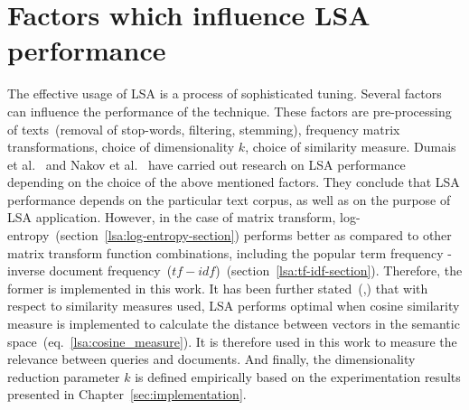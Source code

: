 \section{Factors which influence LSA performance}
\label{sec:lsa:factors_infl_lsa}
The effective usage of \gls{LSA} is a process of sophisticated tuning. Several factors can influence the performance of the technique. These factors are pre-processing of texts~(removal of stop-words, filtering, stemming), frequency matrix transformations, choice of dimensionality $k$, choice of similarity measure. Dumais et al.~\cite{dumais91improving} and Nakov et al.~\cite{Nakov_weightfunctions} have carried out research on \gls{LSA} performance depending on the choice of the above mentioned factors. They conclude that \gls{LSA} performance depends on the particular text corpus, as well as on the purpose of \gls{LSA} application. However, in the case of matrix transform, log-entropy~(section~\ref{lsa:log-entropy-section}) performs better as compared to other matrix transform function combinations, including the popular term frequency - inverse document frequency~($tf-idf$)~(section~\ref{lsa:tf-idf-section}). Therefore, the former is implemented in this work. It has been further stated~(\cite{dumais91improving},\cite{NakovBetterResultsLSI}) that with respect to similarity measures used, \gls{LSA} performs optimal when cosine similarity measure is implemented to calculate the distance between vectors in the semantic space~(eq.~\ref{lsa:cosine_measure}). It is therefore used in this work to measure the relevance between queries and documents. And finally, the dimensionality reduction parameter $k$ is defined empirically based on the experimentation results presented in Chapter~\ref{sec:implementation}.
